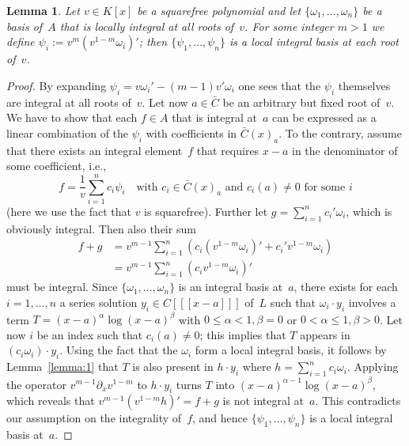 \documentclass{sig-alternate}
\newtheorem{lemma}[theorem]{Lemma}
\begin{document}
\begin{lemma}\label{lemma:ibv}
Let $v\in K[x]$ be a squarefree polynomial and let $\{\omega_1,\ldots,\omega_n\}$
be a basis of~$A$ that is locally integral at all roots of~$v$.
For some integer $m>1$ we define $\psi_i:=v^m\left(v^{1-m}\omega_i\right)'$; then
$\{\psi_1,\ldots,\psi_n\}$ is a local integral basis at each root of~$v$.
\end{lemma}
\begin{proof}
By expanding $\psi_i=v\omega_i'-(m-1)v'\omega_i$ one sees that the $\psi_i$
themselves are integral at all roots of~$v$. Let now $a\in\bar{C}$ be an
arbitrary but fixed root of~$v$. We have to show that each $f\in A$ that is
integral at~$a$ can be expressed as a linear combination of the $\psi_i$ with
coefficients in $\bar C(x)_a$. To the contrary, assume that there exists an
integral element~$f$ that requires $x-a$ in the denominator of some
coefficient, i.e.,
\[
  f = \frac{1}{v} \sum_{i=1}^n c_i \psi_i \quad\text{with }c_i\in \bar{C}(x)_a
  \text{ and } c_i(a)\neq0 \text{ for some } i
\]
(here we use the fact that $v$ is squarefree).  Further let $g=\sum_{i=1}^n
c_i'\omega_i$, which is obviously integral. Then also their sum
\begin{align*}
  f+g &= v^{m-1} \sum_{i=1}^n \left(c_i\left(v^{1-m}\omega_i\right)'
  + c_i'v^{1-m}\omega_i \right) \\
  &= v^{m-1} \sum_{i=1}^n \left(c_iv^{1-m}\omega_i\right)'
\end{align*}
must be integral. Since $\{\omega_1,\ldots,\omega_n\}$ is an integral basis at~$a$,
there exists for each $i=1,\ldots,n$ a series solution $y_i\in C[[[x-a]]]$
of~$L$ such that $\omega_i\cdot y_i$ involves a term
$T=(x-a)^\alpha\log(x-a)^\beta$ with $0\leq\alpha<1,\beta=0$ or
$0<\alpha\leq1,\beta>0$. Let now $i$ be an index such that $c_i(a)\neq0$;
this implies that $T$ appears in $(c_i\omega_i)\cdot y_i$.
Using the fact that the $\omega_i$ form a local integral basis, it follows by
Lemma~\ref{lemma:1} that $T$ is also present in $h\cdot y_i$ where
$h=\sum_{i=1}^n c_i\omega_i$. Applying the operator $v^{m-1}\partial_xv^{1-m}$
to $h\cdot y_i$ turns $T$ into $(x-a)^{\alpha-1}\log(x-a)^\beta$, which reveals that
$v^{m-1}(v^{1-m}h)'=f+g$ is not integral at~$a$. This contradicts our assumption on
the integrality of~$f$, and hence $\{\psi_1,\ldots,\psi_n\}$ is a local integral
basis at~$a$.
\end{proof}
\end{document}
